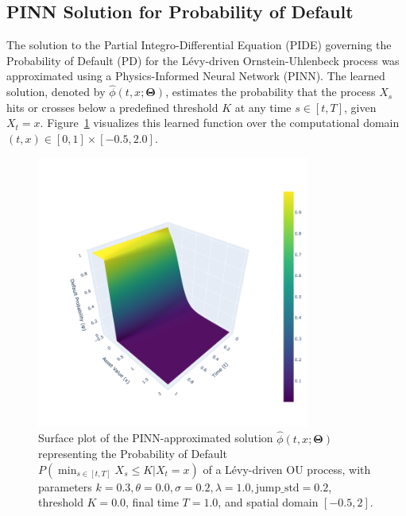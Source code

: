 \documentclass[11pt,twoside,openright]{report}
\begin{document}
\subsection{PINN Solution for Probability of Default}
\label{sec:pinn_pd_solution_results} %
 
The solution to the Partial Integro-Differential Equation (PIDE) governing the Probability of Default (PD) for the Lévy-driven Ornstein-Uhlenbeck process was approximated using a Physics-Informed Neural Network (PINN). The learned solution, denoted by $\hat{\phi}(t, x; \mathbf{\Theta})$, estimates the probability that the process $X_s$ hits or crosses below a predefined threshold $K$ at any time $s \in [t, T]$, given $X_t = x$. Figure~\ref{fig:pinn_levy_ou_pd_solution} visualizes this learned function over the computational domain $(t, x) \in [0, 1] \times [-0.5, 2.0]$.
 
\begin{figure}[htbp]
    \centering
    \includegraphics[width=0.8\textwidth]{Figures/pinn_3d_stable_data.png} %
    \caption{Surface plot of the PINN-approximated solution $\hat{\phi}(t, x; \mathbf{\Theta})$ representing the Probability of Default $P(\min_{s \in [t, T]} X_s \le K | X_t = x)$ of a Lévy-driven OU process, with parameters $k=0.3, \theta=0.0, \sigma=0.2, \lambda=1.0, \text{jump\_std}=0.2$, threshold $K=0.0$, final time $T=1.0$, and spatial domain $[-0.5, 2]$.}
    \label{fig:pinn_levy_ou_pd_solution} %
\end{figure}
 
\end{document}
